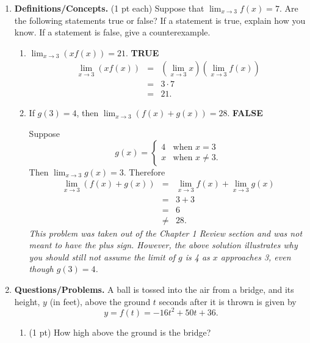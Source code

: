 \documentclass[11pt,letterpaper]{article}
\begin{document}
\begin{enumerate}
\item  \textbf{Definitions/Concepts.} (1 pt each) Suppose that $\lim_{x\rightarrow 3}f(x)=7$.  Are the following statements true or false?  If a statement is true, explain how you know.  If a statement is false, give a counterexample.
\begin{enumerate} 
\item $\lim_{x\rightarrow 3}\left(xf(x)\right)=21$.  \textbf{TRUE}
\begin{eqnarray*}
 \lim_{x\rightarrow 3}\left(xf(x)\right) &=& \left(\lim_{x\rightarrow 3}x\right)\left(\lim_{x\rightarrow 3}f(x)\right) \\
&=& 3\cdot 7 \\
&=& 21.
\end{eqnarray*}

\vspace{.5pc}
\item If $g(3)=4$, then $\lim_{x\rightarrow 3}\left(f(x)+g(x)\right)=28$.  \textbf{FALSE}

\vspace{.5pc}
Suppose
\[g(x)=\left\{\begin{array}{ll}
               4 & \text{when }x=3 \\
               x & \text{when }x\neq 3.
              \end{array}\right.
\]
Then $\lim_{x\rightarrow 3}g(x)=3$.  Therefore
\begin{eqnarray*}
 \lim_{x\rightarrow 3}\left(f(x)+g(x)\right) &=& \lim_{x\rightarrow 3}f(x)+\lim_{x\rightarrow 3}g(x) \\
&=& 3+3 \\
&=& 6 \\
&\neq & 28.
\end{eqnarray*}
\textit{This problem was taken out of the Chapter 1 Review section and was not meant to have the plus sign.  However, the above solution illustrates why you should still not assume the limit of $g$ is 4 as $x$ approaches 3, even though $g(3)=4$.}

\vspace{.5pc}
\end{enumerate}

\item \textbf{Questions/Problems.} A ball is tossed into the air from a bridge, and its height, $y$ (in feet), above the ground $t$ seconds after it is thrown is given by 
\[y=f(t)=-16t^2+50t+36.\]
\begin{enumerate}
\item (1 pt) How high above the ground is the bridge? 


\end{enumerate}
\end{enumerate}
\end{document}
